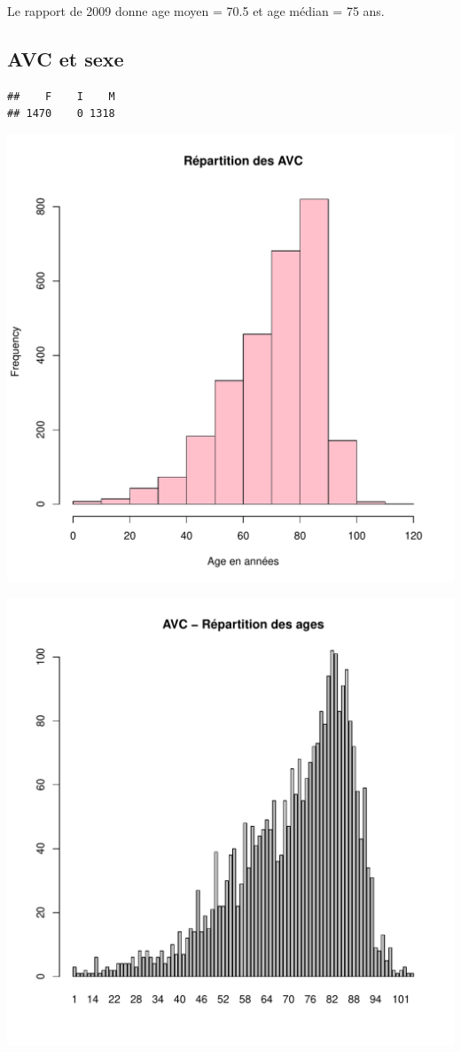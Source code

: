 \documentclass[12pt,english,french,twoside]{book}\usepackage[]{graphicx}\usepackage[]{color}
\makeatletter
\def\maxwidth{ %
  \ifdim\Gin@nat@width>\linewidth
    \linewidth
  \else
    \Gin@nat@width
  \fi
}
\newenvironment{kframe}{%
 \def\at@end@of@kframe{}%
 \ifinner\ifhmode%
  \def\at@end@of@kframe{\end{minipage}}%
  \begin{minipage}{\columnwidth}%
 \fi\fi%
 \def\FrameCommand##1{\hskip\@totalleftmargin \hskip-\fboxsep
 \colorbox{shadecolor}{##1}\hskip-\fboxsep
     \hskip-\linewidth \hskip-\@totalleftmargin \hskip\columnwidth}%
 \MakeFramed {\advance\hsize-\width
   \@totalleftmargin\z@ \linewidth\hsize
   \@setminipage}}%
 {\par\unskip\endMakeFramed%
 \at@end@of@kframe}
\newenvironment{knitrout}{}{} %
\makeatother
\begin{document}
Le rapport de 2009 donne age moyen = 70.5 et age médian = 75 ans.

\subsection*{AVC et sexe}
\begin{knitrout}
\color{fgcolor}\begin{kframe}
\begin{verbatim}
##    F    I    M 
## 1470    0 1318
\end{verbatim}
\end{kframe}
\includegraphics[width=\maxwidth]{figure/avc_sexe1} 

\includegraphics[width=\maxwidth]{figure/avc_sexe2} 


\end{knitrout}
\end{document}
